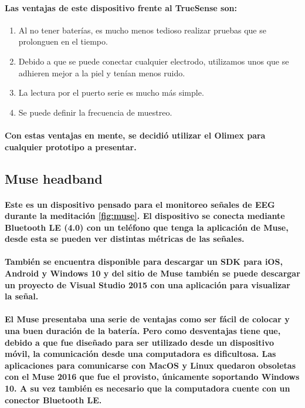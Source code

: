 \documentclass{article}
\begin{document}
\paragraph{
Las ventajas de este dispositivo frente al TrueSense son:
}

\begin{enumerate}
  \item Al no tener baterías, es mucho menos tedioso realizar pruebas que se prolonguen en el tiempo.
  \item Debido a que se puede conectar cualquier electrodo, utilizamos unos que se adhieren mejor a la piel y tenían menos ruido.
  \item La lectura por el puerto serie es mucho más simple.
  \item Se puede definir la frecuencia de muestreo.
\end{enumerate}
\paragraph{
Con estas ventajas en mente, se decidió utilizar el Olimex para cualquier prototipo a presentar.
}

\subsection{Muse headband}
\paragraph{
Este es un dispositivo pensado para el monitoreo señales de EEG durante la meditación \ref{fig:muse}. El dispositivo se conecta mediante Bluetooth LE (4.0) con un teléfono que tenga la aplicación de Muse, desde esta se pueden ver distintas métricas de las señales.
}
\paragraph{
También se encuentra disponible para descargar un SDK para iOS, Android y Windows 10 y del sitio de Muse también se puede descargar un proyecto de Visual Studio 2015 con una aplicación para visualizar la señal.
}
\paragraph{
El Muse presentaba una serie de ventajas como ser fácil de colocar y una buen duración de la batería. Pero como desventajas tiene que, debido a que fue diseñado para ser utilizado desde un dispositivo móvil, la comunicación desde una computadora es dificultosa. Las aplicaciones para comunicarse con MacOS y Linux quedaron obsoletas con el Muse 2016 que fue el provisto, únicamente soportando Windows 10. A su vez también es necesario que la computadora cuente con un conector Bluetooth LE.
}
\end{document}
